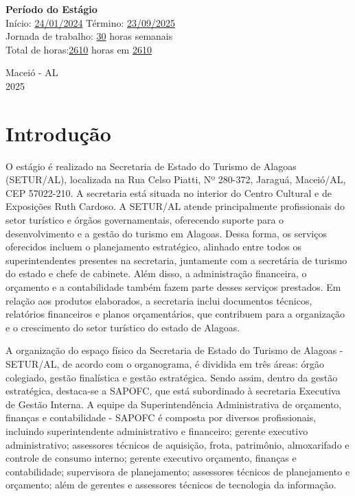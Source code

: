 \documentclass[12pt,a4paper]{article}
\begin{document}
	\vspace{0.5cm}
	\noindent \textbf{Período do Estágio} \\
	Início: \underline{24/01/2024\hspace{0.0cm}} \quad Término: \underline{23/09/2025\hspace{0.0cm}} \\
	Jornada de trabalho: \underline{30\hspace{0.0cm}} horas semanais \\
	Total de horas:\underline{2610\hspace{0.0cm}} horas em  \underline{2610\hspace{0.0cm}} \\
	
	\vfill
	\begin{flushright}
		\centering Maceió - AL \\
		2025
	\end{flushright}
	
	\newpage
	
	\section{Introdução}
	
	\hspace*{1.5cm}O estágio é realizado na Secretaria de Estado do Turismo de Alagoas (SETUR/AL), localizada na Rua Celso Piatti, Nº 280-372, Jaraguá, Maceió/AL, CEP 57022-210. A secretaria está situada no interior do Centro Cultural e de Exposições Ruth Cardoso. A SETUR/AL atende principalmente profissionais do setor turístico e órgãos governamentais, oferecendo suporte para o desenvolvimento e a gestão do turismo em Alagoas. Dessa forma, os serviços oferecidos incluem o planejamento estratégico, alinhado entre todos os superintendentes presentes na secretaria, juntamente com a secretária de turismo do estado e chefe de cabinete. Além disso, a administração financeira, o orçamento e a contabilidade também fazem parte desses serviços prestados. Em relação aos produtos elaborados, a secretaria inclui documentos técnicos, relatórios financeiros e planos orçamentários, que contribuem para a organização e o crescimento do setor turístico do estado de Alagoas.
	
	A organização do espaço físico da Secretaria de Estado do Turismo de Alagoas - SETUR/AL, de acordo com o organograma, é dividida em três áreas: órgão colegiado, gestão finalística e gestão estratégica. Sendo assim, dentro da gestão estratégica, destaca-se a SAPOFC, que está subordinado à secretaria Executiva de Gestão Interna.
	A equipe da Superintendência Administrativa de orçamento, finanças e contabilidade - SAPOFC é composta por diversos profissionais, incluindo superintendente administrativo e financeiro; gerente executivo administrativo; assessores técnicos de aquisição, frota, patrimônio, almoxarifado e controle de consumo interno; gerente executivo orçamento, finanças e contabilidade; supervisora de planejamento; assessores técnicos de planejamento e orçamento; além de gerentes e assessores técnicos de tecnologia da informação. 
	
\end{document}
